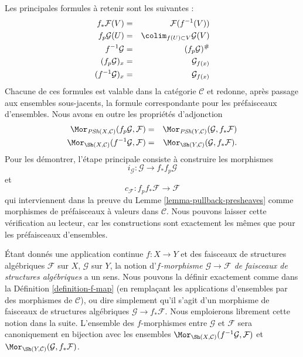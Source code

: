 \medskip\noindent
Les principales formules à retenir sont les suivantes :
\begin{eqnarray*}
f_*\mathcal{F}(V) & = & \mathcal{F}(f^{-1}(V)) \\
f_p\mathcal{G}(U) & = & \colim_{f(U) \subset V} \mathcal{G}(V) \\
f^{-1}\mathcal{G} & = & (f_p\mathcal{G})^\# \\
(f_p\mathcal{G})_x & = & \mathcal{G}_{f(x)} \\
(f^{-1}\mathcal{G})_x & = & \mathcal{G}_{f(x)}
\end{eqnarray*}
Chacune de ces formules est valable dans la
catégorie $\mathcal{C}$ et redonne, après passage aux ensembles
sous-jacents, la formule correspondante pour les préfaisceaux d'ensembles.
Nous avons en outre les propriétés d'adjonction
\begin{eqnarray*}
\Mor_{\textit{PSh}(X, \mathcal{C})}(f_p\mathcal{G}, \mathcal{F})
& = &
\Mor_{\textit{PSh}(Y, \mathcal{C})}(\mathcal{G}, f_*\mathcal{F}) \\
\Mor_{\Sh(X, \mathcal{C})}(f^{-1}\mathcal{G}, \mathcal{F})
& = &
\Mor_{\Sh(Y, \mathcal{C})}(\mathcal{G}, f_*\mathcal{F}).
\end{eqnarray*}
Pour les démontrer, l'étape principale consiste à construire les morphismes
$$
i_\mathcal{G} : \mathcal{G} \longrightarrow f_*f_p\mathcal{G}
$$
et
$$
c_\mathcal{F} : f_p f_* \mathcal{F} \longrightarrow \mathcal{F}
$$
qui interviennent dans la preuve du Lemme \ref{lemma-pullback-presheaves} comme
morphismes de préfaisceaux à valeurs dans $\mathcal{C}$. Nous pouvons
laisser cette vérification au lecteur, car les constructions sont exactement les mêmes
que pour les préfaisceaux d'ensembles.

\medskip\noindent
Étant donnés une application continue $f : X \to Y$ et des faisceaux de structures
algébriques $\mathcal{F}$ sur $X$, $\mathcal{G}$ sur $Y$, la notion
d'{\it $f$-morphisme $\mathcal{G} \to \mathcal{F}$
de faisceaux de structures algébriques} a un sens. Nous pouvons la définir
exactement comme dans la Définition \ref{definition-f-map} (en remplaçant les applications
d'ensembles par des morphismes de $\mathcal{C}$), ou
dire simplement qu'il s'agit d'un morphisme de faisceaux de structures
algébriques $\mathcal{G} \to f_*\mathcal{F}$. Nous emploierons librement cette
notion dans la suite. L'ensemble des $f$-morphismes entre
$\mathcal{G}$ et $\mathcal{F}$ sera canoniquement en bijection
avec les ensembles
$\Mor_{\Sh(X, \mathcal{C})}(f^{-1}\mathcal{G}, \mathcal{F})$
et
$\Mor_{\Sh(Y, \mathcal{C})}(\mathcal{G}, f_*\mathcal{F})$.

